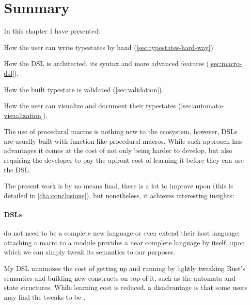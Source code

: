 
\section{Summary}

In this chapter I have presented:
\begin{compactitem}
    \item How the user can write typestates by hand (\autoref{sec:typestates-hard-way}).
    \item How the DSL is architected, its syntax and more advanced features (\autoref{sec:macro-dsl}).
    \item How the built typestate is validated (\autoref{sec:validation}).
    \item How the user can visualize and document their typestates (\autoref{sec:automata-visualization}).
\end{compactitem}

The use of procedural macros is nothing new to the ecosystem, however, DSLs are usually built with function-like procedural macros.
While such approach has advantages  it comes at the cost of not only being harder to develop,
but also requiring the developer to pay the upfront cost of learning it before they can use the DSL.

The present work is by no means final, there is a lot to improve upon (this is detailed in \autoref{cha:conclusions}),
but nonetheless, it achieves interesting insights:


\paragraph{DSLs} do not need to be a complete new language or even extend their host language;
attaching a macro to a module provides a near complete language by itself,
upon which we can simply tweak its semantics to our purposes.

My DSL minimizes the cost of getting up and running by lightly tweaking Rust's semantics and building new constructs on top of it,
such as the automata and state structures.
While learning cost is reduced, a disadvantage is that some users may find the tweaks to be .


